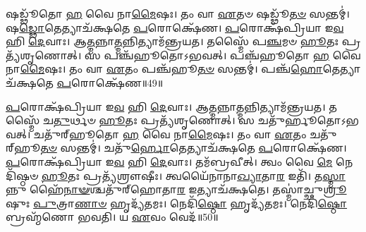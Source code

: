 𑌷𑌡𑍍𑌢𑍂᳴𑌤𑍋 \ul{𑌹} 𑌵𑍈 𑌨𑌾\-\ul{𑌮𑍈}\-𑌷𑌃।
𑌤𑌂 𑌵𑌾 \ul{𑌏}\-𑌤𑍞 𑌷𑌡𑍍𑌢𑍂᳴\-\ul{𑌤}\-\-\ul{𑍞} 𑌸𑌨𑍍𑌤𑌮𑍍॑।
𑌷\-\ul{𑌡𑍍𑌢𑍋}\-𑌤𑍇𑌤𑍍𑌯𑌾𑌚᳴𑌕𑍍𑌷𑌤𑍇 \ul{𑌪}\-𑌰𑍋𑌕𑍍𑌷𑍇᳴𑌣।
\-\ul{𑌪}\-𑌰𑍋𑌕𑍍𑌷᳴𑌪𑍍𑌰𑌿𑌯𑌾 𑌇\-\ul{𑌵} 𑌹𑌿 \ul{𑌦𑍇}\-𑌵𑌾𑌃।
𑌆\-\ul{𑌤𑍍𑌮}\-𑌨𑍍𑌨𑌾\-\ul{𑌤𑍍𑌮}\-𑌨𑍍𑌨𑌿𑌤𑍍𑌯𑌾𑌮᳴𑌨𑍍𑌤𑍍𑌰𑌯𑌤।
𑌤𑌸𑍍𑌮𑍈᳴ 𑌪\-\ul{𑌞𑍍𑌚}\-𑌮𑍞 \ul{𑌹𑍂}\-𑌤𑌃 𑌪𑍍𑌰𑌤𑍍𑌯᳴𑌶𑍃𑌣𑍋𑌤𑍍।
𑌸 𑌪𑌞𑍍𑌚᳴𑌹𑍂𑌤𑍋\-𑌽𑌭𑌵𑌤𑍍।
𑌪𑌞𑍍𑌚᳴𑌹𑍂𑌤𑍋 \ul{𑌹} 𑌵𑍈 𑌨𑌾\-\ul{𑌮𑍈}\-𑌷𑌃।
𑌤𑌂 𑌵𑌾 \ul{𑌏}\-𑌤𑌂 𑌪𑌞𑍍𑌚᳴𑌹𑍂\-\ul{𑌤}\-\-\ul{𑍞} 𑌸𑌨𑍍𑌤𑌮𑍍॑।
𑌪𑌞𑍍𑌚᳴\-\ul{𑌹𑍋}\-𑌤𑍇𑌤𑍍𑌯𑌾𑌚᳴𑌕𑍍𑌷𑌤𑍇 \ul{𑌪}\-𑌰𑍋𑌕𑍍𑌷𑍇᳴𑌣॥49॥

\-\ul{𑌪}\-𑌰𑍋𑌕𑍍𑌷᳴𑌪𑍍𑌰𑌿𑌯𑌾 𑌇\-\ul{𑌵} 𑌹𑌿 \ul{𑌦𑍇}\-𑌵𑌾𑌃।
𑌆\-\ul{𑌤𑍍𑌮}\-𑌨𑍍𑌨𑌾\-\ul{𑌤𑍍𑌮}\-𑌨𑍍𑌨𑌿𑌤𑍍𑌯𑌾𑌮᳴𑌨𑍍𑌤𑍍𑌰𑌯𑌤।
𑌤𑌸𑍍𑌮𑍈᳴ 𑌚\-\ul{𑌤𑍁}\-𑌰𑍍𑌥𑍞 \ul{𑌹𑍂}\-𑌤𑌃 𑌪𑍍𑌰𑌤𑍍𑌯᳴𑌶𑍃𑌣𑍋𑌤𑍍।
𑌸 𑌚𑌤𑍁᳴𑌰𑍍\mbox{}𑌹𑍂𑌤𑍋\-𑌽𑌭𑌵𑌤𑍍।
𑌚𑌤𑍁᳴𑌰𑍍‌\mbox{}𑌹𑍂𑌤𑍋 \ul{𑌹} 𑌵𑍈 𑌨𑌾\-\ul{𑌮𑍈}\-𑌷𑌃।
𑌤𑌂 𑌵𑌾 \ul{𑌏}\-𑌤𑌂 𑌚𑌤𑍁᳴𑌰𑍍‌\mbox{}𑌹𑍂\-\ul{𑌤}\-\-\ul{𑍞} 𑌸𑌨𑍍𑌤𑌮𑍍॑।
𑌚𑌤𑍁᳴\-\ul{𑌰𑍍𑌹𑍋}\-𑌤𑍇𑌤𑍍𑌯𑌾𑌚᳴𑌕𑍍𑌷𑌤𑍇 \ul{𑌪}\-𑌰𑍋𑌕𑍍𑌷𑍇᳴𑌣।
\-\ul{𑌪}\-𑌰𑍋𑌕𑍍𑌷᳴𑌪𑍍𑌰𑌿𑌯𑌾 𑌇\-\ul{𑌵} 𑌹𑌿 \ul{𑌦𑍇}\-𑌵𑌾𑌃।
𑌤𑌮᳴𑌬𑍍𑌰𑌵𑍀𑌤𑍍।
𑌤𑍍𑌵𑌂 𑌵𑍈 \ul{𑌮𑍇} 𑌨𑍇𑌦𑌿᳴𑌷𑍍𑌠𑍞 \ul{𑌹𑍂}\-𑌤𑌃 𑌪𑍍𑌰𑌤𑍍𑌯᳴𑌶𑍍𑌰𑍗𑌷𑍀𑌃।
𑌤𑍍𑌵𑌯𑍈᳴𑌨𑌾𑌨𑌾\-\ul{𑌖𑍍𑌯𑌾}\-𑌤𑌾\-\ul{𑌰} 𑌇𑌤𑌿᳴।
𑌤\-\ul{𑌸𑍍𑌮𑌾}\-𑌨𑍍𑌨𑍁 𑌹𑍈᳴\-\ul{𑌨𑌾}\-\-\ul{𑍟}\-𑌶𑍍𑌚𑌤𑍁᳴𑌰𑍍‌\mbox{}𑌹𑍋𑌤𑌾\-\ul{𑌰} 𑌇𑌤𑍍𑌯𑌾𑌚᳴𑌕𑍍𑌷𑌤𑍇।
𑌤𑌸𑍍𑌮𑌾॑𑌚𑍍𑌛𑍁\-\ul{𑌶𑍍𑌰𑍂}\-𑌷𑍁𑌃 \ul{𑌪𑍁}\-𑌤𑍍𑌰𑌾\-\ul{𑌣𑌾}\-\-\ul{𑍞} 𑌹𑍃𑌦𑍍𑌯᳴𑌤𑌮𑌃।
𑌨𑍇𑌦𑌿᳴\-\ul{𑌷𑍍𑌠𑍋} 𑌹𑍃𑌦𑍍𑌯᳴𑌤𑌮𑌃।
𑌨𑍇𑌦𑌿᳴\-\ul{𑌷𑍍𑌠𑍋} 𑌬𑍍𑌰𑌹𑍍𑌮᳴𑌣𑍋 𑌭𑌵𑌤𑌿।
𑌯 \ul{𑌏}\-𑌵𑌂 𑌵𑍇𑌦᳴॥50॥\anuvakamend[\-\ul{𑌦𑍇}\-𑌵𑌾𑌃 𑌷𑌡𑍍𑌢𑍂᳴𑌤𑍋\-𑌽𑌭\-\ul{𑌵}\-𑌤𑍍𑌪𑌞𑍍𑌚᳴\-\ul{𑌹𑍋}\-𑌤𑍇𑌤𑍍𑌯𑌾𑌚᳴𑌕𑍍𑌷𑌤𑍇 \ul{𑌪}\-𑌰𑍋𑌕𑍍𑌷𑍇᳴𑌣𑌾𑌶𑍍𑌰𑍗\-\ul{𑌷𑍀𑌃} 𑌷𑌟𑍍𑌚᳴]




